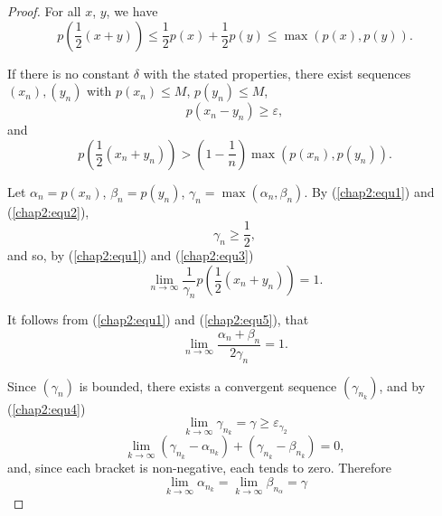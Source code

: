 \begin{proof}
  For all $x$, $y$, we have
  \begin{equation*}
    p \left(\frac{1}{2} (x + y)\right) \le \frac{1}{2} p (x) +
    \frac{1}{2} p(y) \le \max (p(x), p(y)). \tag{1}\label{chap2:equ1} 
  \end{equation*}
  
  If there is no constant $\delta$ with the stated properties, there
  exist sequences $(x_n), (y_n)$ with $p(x_n) \le M$, $p(y_n) \le M$, 
\begin{equation*}
    p(x_n - y_n) \ge \varepsilon, \tag{2}\label{chap2:equ2} 
\end{equation*}
and
\begin{equation*}
 p \left(\frac{1}{2} (x_n + y_n)\right) > \left(1 - \frac{1}{n}\right)
 \max (p(x_n), p(y_n)).  \tag{3}\label{chap2:equ3}  
\end{equation*}

Let $\alpha_n = p (x_n)$, $\beta_n = p (y_n)$, $\gamma_n = \max (\alpha_n,
\beta_n)$. By (\ref{chap2:equ1}) and (\ref{chap2:equ2}), 
\begin{equation*}
  \gamma_n \ge \frac{1}{2}, \tag{4}\label{chap2:equ4}
\end{equation*}
and so, by (\ref{chap2:equ1}) and (\ref{chap2:equ3})
\begin{equation*}
  \lim_{n \to \infty} \frac{1}{\gamma_n} p \left(\frac{1}{2} (x_n +
  y_n)\right) = 1.  \tag{5}\label{chap2:equ5} 
\end{equation*}

It follows from (\ref{chap2:equ1}) and (\ref{chap2:equ5}), that
\begin{equation*}
\lim_{n \to \infty} \frac{\alpha_n + \beta_n}{2 \gamma_n} =
1. \tag{6}\label{chap2:equ6} 
\end{equation*}

Since $(\gamma_n)$ is bounded, there exists a convergent sequence
$(\gamma_{n_k})$, and by (\ref{chap2:equ4}) 
\begin{equation*}
  \lim_{k \to \infty} \gamma_{n_k} = \gamma \ge \varepsilon_{\gamma_2}
  \tag{7}\label{chap2:equ7} 
\end{equation*}
$$
\lim\limits_{k \to \infty} (\gamma_{n_k} - \alpha_{n_k}) +
(\gamma_{n_k} - \beta_{n_k}) = 0, 
$$\pageoriginale
and, since each bracket is non-negative, each tends to zero. Therefore
\begin{equation*}
  \lim_{k \to \infty} \alpha_{n_k} = \lim_{k \to \infty}
  \beta_{n_\alpha} = \gamma \tag{8}\label{chap2:equ8} 
\end{equation*}


\end{proof}
